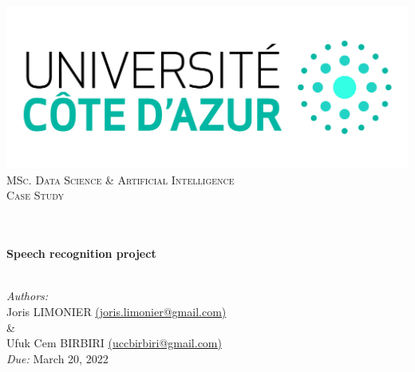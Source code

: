 \begin{titlepage}
	\begin{center}
		\includegraphics[width=\textwidth]{images/logo_uca.jpeg}\\[0.1cm]
		\vspace{1.5cm}
		\textsc{\Large MSc. Data Science \& Artificial Intelligence}\\[1.2cm]
		\textsc{\Large Case Study}\\[1.2cm]
		\\
		\vspace{1cm}

		\HRule \\[0.6cm]
		{\huge \bfseries Speech recognition project}\\[0.3cm]
		\HRule \\[1.3cm]
		\vfill

		\large
		\emph{Authors:} 
		\\[.2cm]
		Joris LIMONIER \href{mailto:joris.limonier@gmail.com}{\color{black}(joris.limonier@gmail.com)}
		\\[.2cm]
		\&
		\\[.2cm]
		Ufuk Cem BIRBIRI
		\href{mailto:uccbirbiri@gmail.com}{\color{black}(uccbirbiri@gmail.com)} \\[.5cm]
		\emph{Due:} {\large March 20, 2022}
	\end{center}
\end{titlepage}


